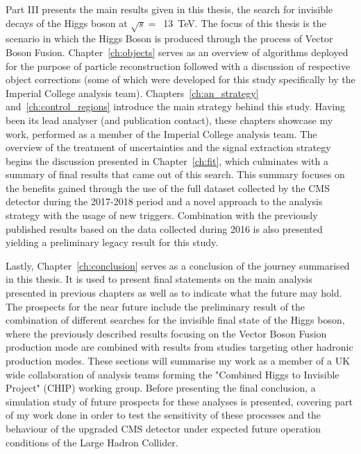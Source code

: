 \hspace{10pt} Part III presents the main results given in this thesis, the search for invisible decays of the Higgs boson at $\sqrt{s}=$~13~TeV. The focus of this thesis is the scenario in which the Higgs Boson is produced through the process of Vector Boson Fusion. Chapter~\ref{ch:objects} serves as an overview of algorithms deployed for the purpose of particle reconstruction followed with a discussion of respective object corrections (some of which were developed for this study specifically by the Imperial College analysis team). Chapters~\ref{ch:an_strategy} and~\ref{ch:control_regions} introduce the main strategy behind this study. Having been its lead analyser (and publication contact), these chapters showcase my work, performed as a member of the Imperial College analysis team. The overview of the treatment of uncertainties and the signal extraction strategy begins the discussion presented in Chapter~\ref{ch:fit}, which culminates with a summary of final results that came out of this search. This summary focuses on the benefits gained through the use of the full dataset collected by the CMS detector during the 2017-2018 period and a novel approach to the analysis strategy with the usage of new triggers. Combination with the previously published results based on the data collected during 2016 is also presented yielding a preliminary legacy result for this study.

\hspace{10pt} Lastly, Chapter~\ref{ch:conclusion} serves as a conclusion of the journey summarised in this thesis. It is used to present final statements on the main analysis presented in previous chapters as well as to indicate what the future may hold. The prospects for the near future include the preliminary result of the combination of different searches for the invisible final state of the Higgs boson, where the previously described results focusing on the Vector Boson Fusion production mode are combined with results from studies targeting other hadronic production modes. These sections will summarise my work as a member of a UK wide collaboration of analysis teams forming the "Combined Higgs to Invisible Project" (CHIP) working group. Before presenting the final conclusion, a simulation study of future prospects for these analyses is presented, covering part of my work done in order to test the sensitivity of these processes and the behaviour of the upgraded CMS detector under expected future operation conditions of the Large Hadron Collider.


